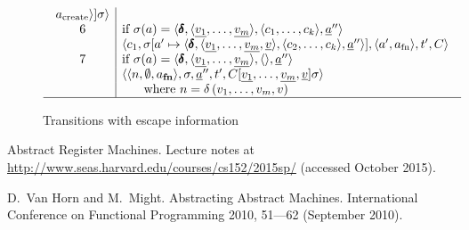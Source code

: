 \RequirePackage[hyphens]{url}\documentclass[12pt,oneside]{amsart}
\newcommand{\kw}[1]{\mathbf{#1}}
\newcommand{\tab}{\hspace{0.5cm}}
\begin{document}
\begin{figure}[hbpt]
\[\begin{array}{c}
\begin{array}{c|l}
        a_\text{create}\rangle]\sigma\rangle \\
    6 & \text{if $\sigma(a) = \langle\pmb{\delta}, \langle\underline{v_1}, \ldots,
        \underline{v_m}\rangle, \langle c_1, \ldots, c_k\rangle, \underline{a}^{\prime\prime}\rangle$} \\ & \langle c_1, \sigma[a^\prime\mapsto\langle\pmb{\delta}, \langle \underline{v_1}, \ldots, \underline{v_m}, \underline{v}\rangle, \langle c_2,\ldots,c_k\rangle,\underline{a}^{\prime\prime}\rangle],\langle a^\prime, a_\text{fn}\rangle,t^\prime, C\rangle \\
    7 & \text{if $\sigma(a) = \langle\pmb{\delta}, \langle\underline{v_1}, \ldots, \underline{v_m}\rangle, \langle\rangle, \underline{a}^{\prime\prime}\rangle$} \\ &
        \langle\langle n, \emptyset, a_\kw{fn}\rangle, \sigma, \underline{a}^{\prime\prime}, t^\prime, C[\underline{v_1}, \ldots, \underline{v_m}, \underline{v}]\sigma\rangle \\ & \tab \text{ where $n = \delta\left(v_1,\ldots,v_m,v\right)$} \\
\end{array} \\ \hline \end{array}\]
\caption{Transitions with escape information}
\label{fig:escape_info}
\end{figure}

\begin{thebibliography}{99}

 Abstract Register Machines. Lecture notes at \url{http://www.seas.harvard.edu/courses/cs152/2015sp/} (accessed October 2015).

 D.~Van Horn and M.~Might. Abstracting Abstract Machines. International Conference on Functional Programming 2010, 51---62 (September 2010).

\end{thebibliography}
\end{document}

